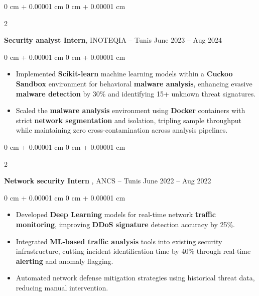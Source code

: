 \documentclass[10pt, letterpaper]{article}
\newenvironment{highlights}{
    \begin{itemize}[
        topsep=0.10 cm,
        parsep=0.10 cm,
        partopsep=0pt,
        itemsep=0pt,
        leftmargin=0 cm + 10pt
    ]
}{
    \end{itemize}
} %
\newenvironment{onecolentry}{
    \begin{adjustwidth}{
        0 cm + 0.00001 cm
    }{
        0 cm + 0.00001 cm
    }
}{
    \end{adjustwidth}
} %
\newenvironment{twocolentry}[2][]{
    \onecolentry
    \def\secondColumn{#2}
    \setcolumnwidth{\fill, 4.5 cm}
    \begin{paracol}{2}
}{
    \switchcolumn \raggedleft \secondColumn
    \end{paracol}
    \endonecolentry
} %
\begin{document}
        \vspace{0.2 cm}


        \begin{twocolentry}{
            June 2023 – Aug 2024
        }
            \textbf{Security analyst Intern}, INOTEQIA  -- Tunis \end{twocolentry}

        \vspace{0.10 cm}
        \begin{onecolentry}
            \begin{highlights}
                \item Implemented \textbf{Scikit-learn} machine learning models within a \textbf{Cuckoo Sandbox} environment for behavioral \textbf{malware analysis}, enhancing evasive \textbf{malware detection} by 30\% and identifying 15+ unknown threat signatures.
                \item Scaled the \textbf{malware analysis} environment using \textbf{Docker} containers with strict \textbf{network segmentation} and isolation, tripling sample throughput while maintaining zero cross-contamination across analysis pipelines.
                \end{highlights}
        \end{onecolentry}

 \vspace{0.2 cm}


        \begin{twocolentry}{
            June 2022 – Aug 2022
        }
            \textbf{Network security Intern }, ANCS  -- Tunis \end{twocolentry}

        \vspace{0.10 cm}
        \begin{onecolentry}
            \begin{highlights}
                \item Developed \textbf{Deep Learning} models for real-time network \textbf{traffic monitoring}, improving \textbf{DDoS signature} detection accuracy by 25\%.
                \item Integrated \textbf{ML-based traffic analysis} tools into existing security infrastructure, cutting incident identification time by 40\% through real-time \textbf{alerting} and anomaly flagging.
                \item Automated network defense mitigation strategies using historical threat data, reducing manual intervention.
                
                \end{highlights}
        \end{onecolentry}
\end{document}
